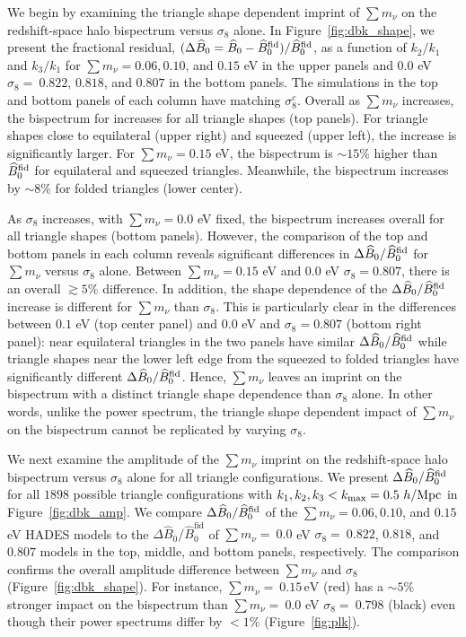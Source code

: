 \documentclass[12pt, letterpaper, preprint]{aastex62}
\newcommand{\smnu}{\sum m_\nu}
\newcommand{\sig}{\sigma_8}
\newcommand{\BOk}{\widehat{B}_0}
\begin{document}
We begin by examining the triangle shape dependent imprint of $\smnu$ on the 
redshift-space halo bispectrum versus $\sig$ alone. In Figure~\ref{fig:dbk_shape}, 
we present the fractional residual, $(\Delta \BOk = \BOk - \BOk^{\rm fid})/\BOk^{\rm fid}$,
as a function of $k_2/k_1$ and $k_3/k_1$ for $\smnu=0.06, 0.10$, and $0.15$ eV 
in the upper panels and 0.0 eV $\sig{=}~0.822$, $0.818$, and $0.807$ in the 
bottom panels. The simulations in the top and bottom panels of each column 
have matching $\sig^{c}$. Overall as $\smnu$ increases, the bispectrum for
increases for all triangle shapes (top panels). For triangle shapes close to 
equilateral (upper right) and squeezed (upper left), the increase is significantly 
larger. For $\smnu=0.15$ eV, the bispectrum is $\sim 15\%$ higher than 
$\BOk^{\rm fid}$ for equilateral and squeezed triangles. Meanwhile, the 
bispectrum increases by $\sim 8\%$ for folded triangles (lower center). 

As $\sig$ increases, with $\smnu = 0.0$ eV fixed, the bispectrum increases 
overall for all triangle shapes (bottom panels). However, the comparison of the
top and bottom panels in each column reveals significant differences in 
$\Delta \BOk/\BOk^{\rm fid}$ for $\smnu$ versus $\sig$ alone. Between 
$\smnu=0.15$ eV and $0.0$ eV $\sig = 0.807$, there is an overall $\gtrsim 5\%$ 
difference. In addition, the shape dependence of the $\Delta \BOk/\BOk^{\rm fid}$ 
increase is different for $\smnu$ than $\sig$. This is particularly clear in 
the differences between $0.1$ eV (top center panel) and 0.0 eV and $\sig=0.807$ 
(bottom right panel): near equilateral triangles in the two panels have similar 
$\Delta \BOk/\BOk^{\rm fid}$ while triangle shapes near the lower left edge from 
the squeezed to folded triangles have significantly different $\Delta \BOk/\BOk^{\rm fid}$. 
Hence, $\smnu$ leaves an imprint on the bispectrum with a distinct triangle 
shape dependence than $\sig$ alone. In other words, unlike the power spectrum, 
the triangle shape dependent impact of $\smnu$ on the bispectrum cannot be 
replicated by varying $\sig$. 

We next examine the amplitude of the $\smnu$ imprint on the redshift-space halo 
bispectrum versus $\sig$ alone for all triangle configurations. We present 
$\Delta \BOk/\BOk^{\rm fid}$ for all $1898$ possible triangle configurations 
with $k_1, k_2, k_3 < k_{\rm max} = 0.5~h/{\rm Mpc}$ in Figure~\ref{fig:dbk_amp}. 
We compare $\Delta \BOk/\BOk^{\rm fid}$ of the $\smnu = 0.06, 0.10$, and 
$0.15$ eV HADES models to the $\Delta \BOk/\BOk^\mathrm{fid}$ of 
$\smnu{=}~0.0$ eV $\sig{=}~0.822$, $0.818$, and $0.807$ models in the
top, middle, and bottom panels, respectively. The comparison confirms the 
overall amplitude difference between $\smnu$ and $\sig$ (Figure~\ref{fig:dbk_shape}). 
For instance, $\smnu{=}~0.15\,\mathrm{eV}$ (red) has a $\sim 5\%$ stronger 
impact on the bispectrum than $\smnu{=}~0.0$ eV $\sig{=}~0.798$ (black) 
even though their power spectrums differ by $< 1\%$ (Figure~\ref{fig:plk}).
\end{document}
